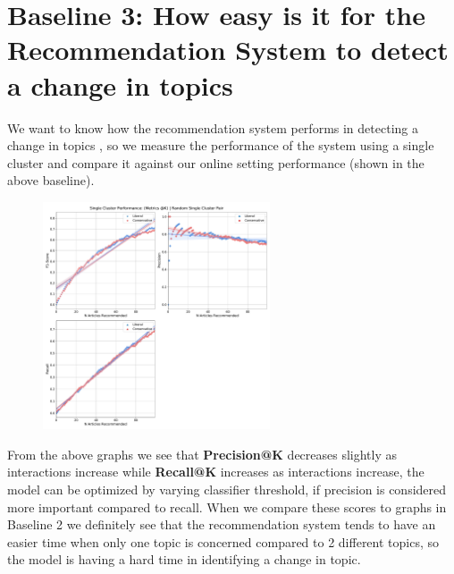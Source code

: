 \documentclass[a4paper,fontsize=9.0pt]{scrartcl}
\begin{document}
\section{Baseline 3: How easy is it for the Recommendation System to detect a change in topics}
\begin{flushleft}
We want to know how the recommendation system performs in detecting a change in topics , so we measure the performance of the system using a single cluster and compare it against our online setting performance (shown in the above baseline). 
\end{flushleft}
\begin{figure}[H]
 \includegraphics[width=0.6\textwidth]{Graphs/user_interaction_vs_model_performance_single_cluster.pdf}
\end{figure}
\begin{flushleft}
From the above graphs we see that \textbf{Precision@K} decreases slightly as interactions increase while \textbf{Recall@K} increases as interactions increase, the model can be optimized by varying classifier threshold, if precision is considered more important compared to recall. When we compare these scores to graphs in Baseline 2 we definitely see that the recommendation system tends to have an easier time when only one topic is concerned compared to 2 different topics, so the model is having a hard time in identifying a change in topic.
\end{flushleft}



\vspace{-1ex}
\end{document}
